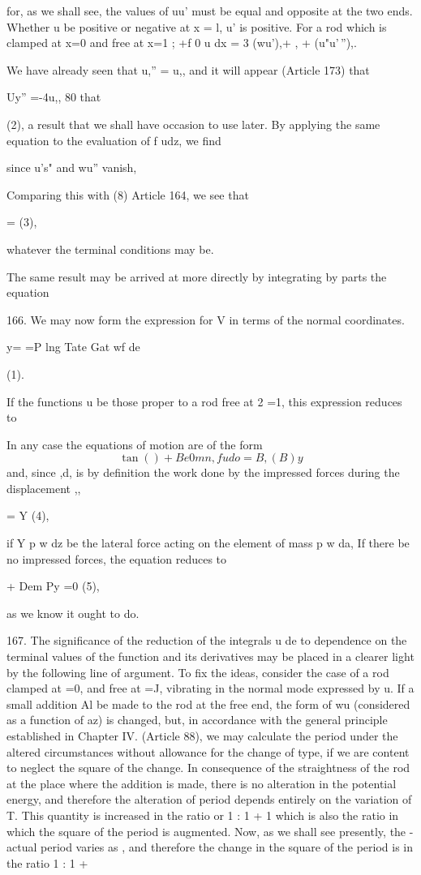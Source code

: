 for, as we shall see, the values of
uu'
must be equal and opposite at the two ends.
Whether u be positive or negative at x = l, u' is positive.
For a rod which is clamped at x=0 and free at x=1 ; +f 0 u dx = 3
(wu'),+ , + (u"u'\,''),.

We have already seen that u,'' = u,, and it will appear (Article 173)
that

Uy'' =-4u,, 80 that

(2), a result that we shall have occasion to use later. By applying the
same equation to the evaluation of f udz, we find

since u's" and wu'' vanish,

Comparing this with (8) Article 164, we see that

= (3),

whatever the terminal conditions may be.

The same result may be arrived at more directly by integrating by parts
the equation


166. We may now form the expression for V in terms of the normal
coordinates.

y= =P lng Tate Gat wf de

(1).

If the functions u be those proper to a rod free at 2 =1, this
expression reduces to

In any case the equations of motion are of the form
\[ \tan() + Be 0 mn, fu do = B, (B)y \]
and, since ,d, is by definition the work done by the impressed forces
during the displacement ,,

= Y (4),

if Y p w dz be the lateral force acting on the element of mass p w da,
If there be no impressed forces, the equation reduces to

+ Dem Py =0 (5),

as we know it ought to do.

167. The significance of the reduction of the integrals u de to
dependence on the terminal values of the function and
its derivatives may be placed in a clearer light by the following line
of argument. To fix the ideas, consider the case of a rod clamped at =0,
and free at =J, vibrating in the normal mode expressed by u. If a small
addition Al be made to the rod at the free end, the form of wu
(considered as a function of az) is changed, but, in accordance with the
general principle established in Chapter IV. (Article 88), we may
calculate the period under the altered circumstances without allowance
for the change of type, if we are content to neglect the square of the
change. In consequence of the straightness of the rod at the place where
the addition is made, there is no alteration in the potential energy,
and therefore the alteration of period depends entirely on the variation
of T. This quantity is increased in the ratio
or 1 : 1 + 1
which is also the ratio in which the square of the period is augmented.
Now, as we shall see presently, the - actual period varies as , and
therefore the change in the square of the period
is in the ratio 1 : 1 +

